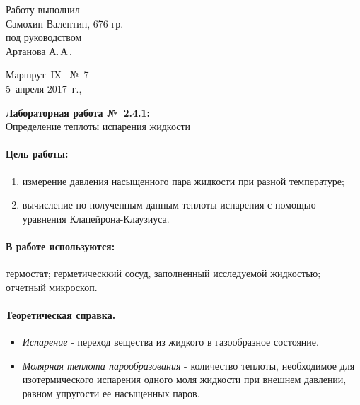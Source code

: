 \documentclass[12pt]{article}
\begin{document}
	\begin{minipage}{0.45\linewidth}
	Работу выполнил\\
	Самохин Валентин, 676 гр.\\[2mm]
	под руководством\\
	Артанова А.\,А\,.
	\end{minipage}
	\hfill
	\begin{minipage}{0.45\linewidth}\flushright
		Маршрут~IX \ №~7\\[3mm]
		5~апреля 2017~г.,\\
		\end{minipage}
		
		\vspace{8mm}
		\begin{center}
			\textbf{\Large Лабораторная работа №~2.4.1:}\\[\parskip]
			\LARGE Определение теплоты испарения жидкости
			\end{center}
			\vspace{0mm}
			
			\paragraph{Цель работы:}
			\begin{enumerate}
				\item измерение давления насыщенного пара жидкости при разной температуре;
				\item вычисление по полученным данным теплоты испарения с помощью уравнения Клапейрона-Клаузиуса.
			\end{enumerate}
			
			\paragraph{В работе используются:}
			термостат; герметическкий сосуд, заполненный исследуемой жидкостью; отчетный микроскоп.
			
			
			\vspace{2\parskip}
		\paragraph{Теоретическая справка.}
		\begin{itemize}
			\item \textit{Испарение} - переход вещества из жидкого в газообразное состояние.
			\item \textit{Молярная теплота парообразования} - количество теплоты, необходимое для изотермического испарения одного моля жидкости при внешнем давлении, равном упругости ее насыщенных паров.
		\end{itemize}
		
\end{document}
